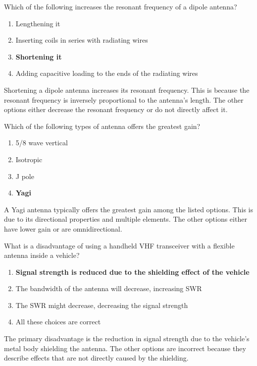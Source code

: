 \begin{tcolorbox}[colback=gray!10!white,colframe=black!75!black,title={T9A05}]
    Which of the following increases the resonant frequency of a dipole antenna?
    \begin{enumerate}[label=\Alph*,noitemsep]
        \item Lengthening it
        \item Inserting coils in series with radiating wires
        \item \textbf{Shortening it}
        \item Adding capacitive loading to the ends of the radiating wires
    \end{enumerate}
\end{tcolorbox}
Shortening a dipole antenna increases its resonant frequency. This is because the resonant frequency is inversely proportional to the antenna's length. The other options either decrease the resonant frequency or do not directly affect it.


\begin{tcolorbox}[colback=gray!10!white,colframe=black!75!black,title={T9A06}]
    Which of the following types of antenna offers the greatest gain?
    \begin{enumerate}[label=\Alph*,noitemsep]
        \item 5/8 wave vertical
        \item Isotropic
        \item J pole
        \item \textbf{Yagi}
    \end{enumerate}
\end{tcolorbox}
A Yagi antenna typically offers the greatest gain among the listed options. This is due to its directional properties and multiple elements. The other options either have lower gain or are omnidirectional.


\begin{tcolorbox}[colback=gray!10!white,colframe=black!75!black,title={T9A07}]
    What is a disadvantage of using a handheld VHF transceiver with a flexible antenna inside a vehicle?
    \begin{enumerate}[label=\Alph*,noitemsep]
        \item \textbf{Signal strength is reduced due to the shielding effect of the vehicle}
        \item The bandwidth of the antenna will decrease, increasing SWR
        \item The SWR might decrease, decreasing the signal strength
        \item All these choices are correct
    \end{enumerate}
\end{tcolorbox}
The primary disadvantage is the reduction in signal strength due to the vehicle's metal body shielding the antenna. The other options are incorrect because they describe effects that are not directly caused by the shielding.


